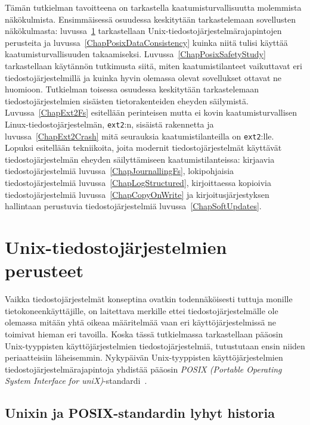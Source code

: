 Tämän tutkielman tavoitteena on tarkastella kaatumisturvallisuutta molemmista näkökulmista.
Ensimmäisessä osuudessa keskitytään tarkastelemaan sovellusten näkökulmasta:
luvussa~\ref{ChapUnixFsBasics} tarkastellaan Unix-tiedosto\-järjestelmärajapintojen perusteita ja luvussa~\ref{ChapPosixDataConsistency} kuinka niitä tulisi käyttää kaatumisturvallisuuden takaamiseksi.
Luvussa~\ref{ChapPosixSafetyStudy} tarkastellaan käytännön tutkimusta siitä,
miten kaatumistilanteet vaikuttavat eri tiedostojärjestelmillä ja kuinka hyvin olemassa olevat sovellukset ottavat ne huomioon.
Tutkielman toisessa osuudessa keskitytään tarkastelemaan tiedostojärjestelmien sisäisten tietorakenteiden eheyden säilymistä.
Luvussa~\ref{ChapExt2Fs} esitellään perinteisen mutta ei kovin kaatumisturvallisen Linux-tiedostojärjestelmän, \texttt{ext2}:n, sisäistä rakennetta ja luvussa~\ref{ChapExt2Crash} mitä seurauksia kaatumistilanteilla on \texttt{ext2}:lle.
Lopuksi esitellään tekniikoita,
joita modernit tiedostojärjestelmät käyttävät tiedostojärjestelmän eheyden säilyttämiseen kaatumistilanteissa: kirjaavia tiedostojärjestelmiä luvussa~\ref{ChapJournallingFs}, lokipohjaisia tiedostojärjestelmiä luvussa~\ref{ChapLogStructured}, kirjoittaessa kopioivia tiedostojärjestelmiä luvussa~\ref{ChapCopyOnWrite} ja kirjoitusjärjestyksen hallintaan perustuvia tiedostojärjestelmiä luvussa~\ref{ChapSoftUpdates}.

\section{Unix-tiedostojärjestelmien perusteet}
\label{ChapUnixFsBasics}

Vaikka tiedostojärjestelmät konseptina ovatkin todennäköisesti tuttuja monille tietokoneenkäyttäjille,
on laitettava merkille ettei tiedostojärjestelmälle ole olemassa mitään yhtä oikeaa määritelmää
vaan eri käyttöjärjestelmissä ne toimivat hieman eri tavoilla.
Koska tässä tutkielmassa tarkastellaan pääosin Unix-tyyppisten käyttöjärjestelmien tiedostojärjestelmiä,
tutustutaan ensin niiden periaatteisiin läheisemmin.
Nykypäivän Unix-tyyppisten käyttöjärjestelmien tiedostojärjestelmärajapintoja yhdistää pääosin \emph{POSIX (Portable Operating System Interface for uniX)}-standardi~\cite{PosixSpec}.

\subsection{Unixin ja POSIX-standardin lyhyt historia}

